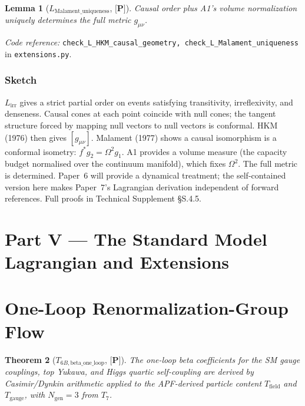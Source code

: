 \documentclass[11pt]{article}
\newcommand{\coderef}[2]{\smallskip\noindent\textit{Code reference:} \texttt{#1} in \texttt{#2}.}
\newcommand{\epitag}[1]{\textbf{[#1]}}
\newtheorem{theorem}{Theorem}[section]
\newtheorem{lemma}[theorem]{Lemma}
\theoremstyle{definition}
\begin{document}
\begin{lemma}[$L_{\mathrm{Malament\_uniqueness}}$, $\epitag{P}$]
Causal order plus A1's volume normalization uniquely determines the full metric $g_{\mu\nu}$.
\end{lemma}

\coderef{check\_L\_HKM\_causal\_geometry,~check\_L\_Malament\_uniqueness}{extensions.py}

\subsubsection*{Sketch}
$L_{\mathrm{irr}}$ gives a strict partial order on events satisfying transitivity, irreflexivity, and denseness.  Causal cones at each point coincide with null cones; the tangent structure forced by mapping null vectors to null vectors is conformal.  HKM (1976) then gives $[g_{\mu\nu}]$.  Malament (1977) shows a causal isomorphism is a conformal isometry: $f^* g_2 = \Omega^2 g_1$.  A1 provides a volume measure (the capacity budget normalised over the continuum manifold), which fixes $\Omega^2$.  The full metric is determined.  Paper~6 will provide a dynamical treatment; the self-contained version here makes Paper~7's Lagrangian derivation independent of forward references.  Full proofs in Technical Supplement \S S.4.5.

\section*{Part V — The Standard Model Lagrangian and Extensions}

\section{One-Loop Renormalization-Group Flow}\label{sec:rg}

\begin{theorem}[$T_{6B,\mathrm{beta\_one\_loop}}$, $\epitag{P}$]
The one-loop beta coefficients for the SM gauge couplings, top Yukawa, and Higgs quartic self-coupling are derived by Casimir/Dynkin arithmetic applied to the APF-derived particle content $T_{\mathrm{field}}$ and $T_{\mathrm{gauge}}$, with $N_{\mathrm{gen}} = 3$ from $T_7$.
\end{theorem}
\end{document}

